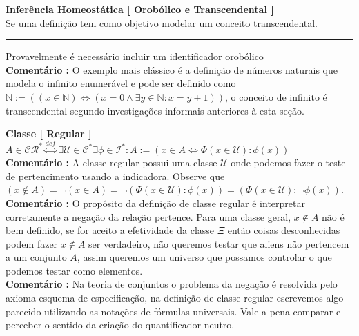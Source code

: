 \documentclass[10pt,a4paper]{report}
\begin{document}
\textbf{Inferência Homeostática [ Orobólico e Transcendental ]}\\

Se uma definição tem como objetivo modelar um conceito transcendental. \\
\hrule 

\hspace{\baselineskip}

Provavelmente é necessário incluir um identificador orobólico\\

\textbf{Comentário :} O exemplo mais clássico é a definição de números naturais que modela o infinito enumerável e pode ser definido como $ \mathbb{N} := ( (x\in \mathbb{N} ) \iff (x = 0 \wedge \exists y \in \mathbb{N} : x = y+1) ) $, o conceito de infinito é transcendental segundo investigações informais anteriores à esta seção.

\hspace{\baselineskip}

\textbf{Classe [ Regular ]} $ A \in \mathcal{CR}^* \overset{def}{\iff} \exists \mathcal{U} \in \mathcal{C}^* \exists \phi \in \mathcal{I}^* : A := ( x \in A \iff \Phi( x \in \mathcal{U} ) : \phi(x) ) $\\

\textbf{Comentário :} A classe regular possui uma classe $\mathcal{U}$ onde podemos fazer o teste de pertencimento usando a indicadora. Observe que $ (x \notin A ) = \neg (x \in A) =  \neg ( \Phi(x \in \mathcal{U}) : \phi(x) ) =  ( \Phi( x \in \mathcal{U}) : \neg \phi(x) )$.\\

\textbf{Comentário :} O propósito da definição de classe regular é interpretar corretamente a negação da relação pertence. Para uma classe geral, $x \notin A$ não é bem definido, se for aceito a efetividade da classe $\Xi$ então coisas desconhecidas podem fazer $x \notin A$ ser verdadeiro, não queremos testar que aliens não pertencem a um conjunto $A$, assim queremos um universo que possamos controlar o que podemos testar como elementos.\\

\textbf{Comentário :} Na teoria de conjuntos o problema da negação é resolvida pelo axioma esquema de especificação, na definição de classe regular escrevemos algo parecido utilizando as notações de fórmulas universais. Vale a pena comparar e perceber o sentido da criação do quantificador neutro.\\
\end{document}
